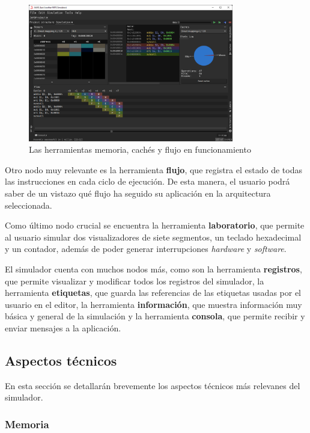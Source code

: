 \begin{figure}[h]
    \centering
    \includegraphics[width=0.8\textwidth]{images/tools/jams-memory-cache-flow}
    \caption{Las herramientas memoria, cachés y flujo en funcionamiento}
    \label{fig:jams-memory-cache-flow}
\end{figure}

Otro nodo muy relevante es la herramienta \textbf{flujo},
que registra el estado de todas las instrucciones en cada ciclo
de ejecución.
De esta manera, el usuario podrá saber de un vistazo qué flujo
ha seguido su aplicación en la arquitectura seleccionada.

Como último nodo crucial se encuentra la herramienta
\textbf{laboratorio}, que permite al usuario simular
dos visualizadores de siete segmentos, un teclado hexadecimal
y un contador, además de poder generar interrupciones \textit{hardware}
y \textit{software}.

El simulador cuenta con muchos nodos más, como son la
herramienta \textbf{registros}, que permite visualizar y modificar
todos los registros del simulador, la herramienta \textbf{etiquetas},
que guarda las referencias de las etiquetas usadas por el usuario
en el editor, la herramienta \textbf{información}, que muestra
información muy básica y general de la simulación y la
herramienta \textbf{consola}, que permite recibir y enviar
mensajes a la aplicación.

\subsection{Aspectos técnicos}\label{subsec:aspectos-tecnicos}

En esta sección se detallarán brevemente los aspectos técnicos
más relevanes del simulador.

\subsubsection{Memoria}\label{subsubsec:memoria}

